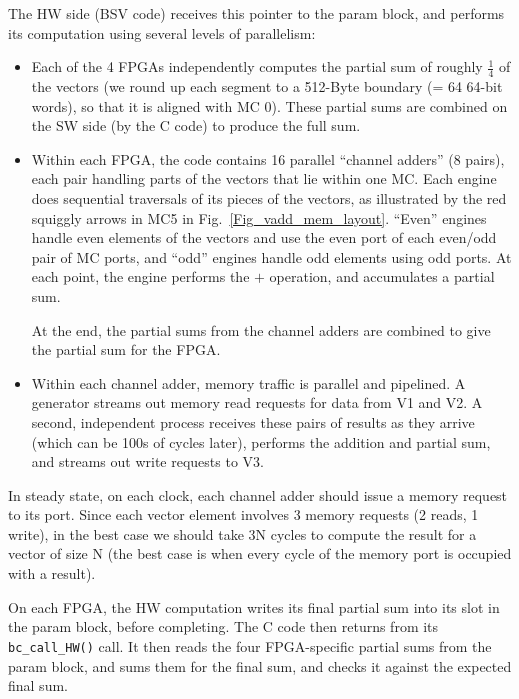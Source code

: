 \documentclass[twoside,letterpaper,11pt]{article}
\begin{document}
The HW side (BSV code) receives this pointer to the param block, and
performs its computation using several levels of parallelism:
\begin{itemize}

\item Each of the 4 FPGAs independently computes the partial sum of
  roughly $\frac{1}{4}$ of the vectors (we round up each segment to a
  512-Byte boundary (= 64 64-bit words), so that it is aligned with MC
  0).  These partial sums are combined on the SW side (by the C code)
  to produce the full sum.

\item Within each FPGA, the code contains 16 parallel ``channel
  adders'' (8 pairs), each pair handling parts of the vectors that lie
  within one MC.  Each engine does sequential traversals of its pieces
  of the vectors, as illustrated by the red squiggly arrows in MC5 in
  Fig.~\ref{Fig_vadd_mem_layout}.  ``Even'' engines handle even
  elements of the vectors and use the even port of each even/odd pair
  of MC ports, and ``odd'' engines handle odd elements using odd
  ports.  At each point, the engine performs the $+$ operation, and
  accumulates a partial sum.

  At the end, the partial sums from the channel adders are combined to
  give the partial sum for the FPGA.

\item Within each channel adder, memory traffic is parallel and
  pipelined.  A generator streams out memory read requests for data
  from V1 and V2.  A second, independent process receives these pairs
  of results as they arrive (which can be 100s of cycles later),
  performs the addition and partial sum, and streams out write
  requests to V3.

\end{itemize}

In steady state, on each clock, each channel adder should issue a
memory request to its port.  Since each vector element involves 3
memory requests (2 reads, 1 write), in the best case we should take 3N
cycles to compute the result for a vector of size N (the best case is
when every cycle of the memory port is occupied with a result).

On each FPGA, the HW computation writes its final partial sum into its
slot in the param block, before completing.  The C code then returns
from its \verb|bc_call_HW()| call.  It then reads the four
FPGA-specific partial sums from the param block, and sums them for the
final sum, and checks it against the expected final sum.
\end{document}
